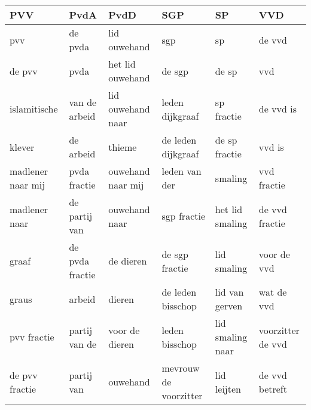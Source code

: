 \begin{tabular}{llllll}
\toprule
               PVV &             PvdA &               PvdD &                    SGP &                SP &                VVD \\
\midrule
               pvv &          de pvda &       lid ouwehand &                    sgp &                sp &             de vvd \\
            de pvv &             pvda &   het lid ouwehand &                 de sgp &             de sp &                vvd \\
      islamitische &    van de arbeid &  lid ouwehand naar &        leden dijkgraaf &        sp fractie &          de vvd is \\
            klever &        de arbeid &             thieme &     de leden dijkgraaf &     de sp fractie &             vvd is \\
 madlener naar mij &     pvda fractie &  ouwehand naar mij &          leden van der &           smaling &        vvd fractie \\
     madlener naar &    de partij van &      ouwehand naar &            sgp fractie &   het lid smaling &     de vvd fractie \\
             graaf &  de pvda fractie &          de dieren &         de sgp fractie &       lid smaling &        voor de vvd \\
             graus &           arbeid &             dieren &      de leden bisschop &    lid van gerven &         wat de vvd \\
       pvv fractie &    partij van de &     voor de dieren &         leden bisschop &  lid smaling naar &  voorzitter de vvd \\
    de pvv fractie &       partij van &           ouwehand &  mevrouw de voorzitter &       lid leijten &     de vvd betreft \\
\bottomrule
\end{tabular}
